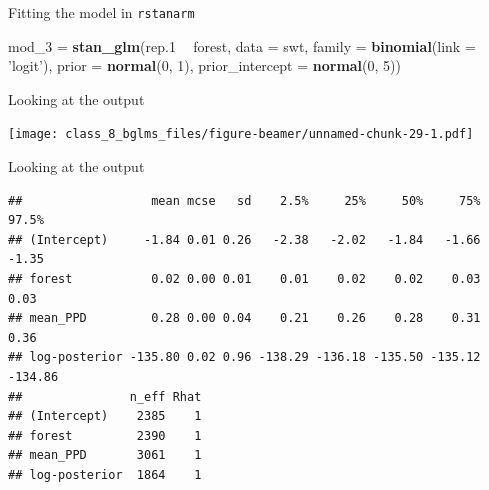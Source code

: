 \documentclass[ignorenonframetext,]{beamer}
\newenvironment{Shaded}{\begin{snugshade}}{\end{snugshade}}
\newcommand{\KeywordTok}[1]{\textcolor[rgb]{0.13,0.29,0.53}{\textbf{#1}}}
\newcommand{\DataTypeTok}[1]{\textcolor[rgb]{0.13,0.29,0.53}{#1}}
\newcommand{\DecValTok}[1]{\textcolor[rgb]{0.00,0.00,0.81}{#1}}
\newcommand{\StringTok}[1]{\textcolor[rgb]{0.31,0.60,0.02}{#1}}
\newcommand{\OperatorTok}[1]{\textcolor[rgb]{0.81,0.36,0.00}{\textbf{#1}}}
\newcommand{\NormalTok}[1]{#1}
\begin{document}
\begin{frame}[fragile]{Fitting the model in \texttt{rstanarm}}

\begin{Shaded}
\begin{Highlighting}[]
\NormalTok{mod_}\DecValTok{3}\NormalTok{ =}\StringTok{ }\KeywordTok{stan_glm}\NormalTok{(rep.}\DecValTok{1} \OperatorTok{~}\StringTok{ }\NormalTok{forest, }
                 \DataTypeTok{data =}\NormalTok{ swt,}
                 \DataTypeTok{family =} \KeywordTok{binomial}\NormalTok{(}\DataTypeTok{link =} \StringTok{'logit'}\NormalTok{),}
                 \DataTypeTok{prior =} \KeywordTok{normal}\NormalTok{(}\DecValTok{0}\NormalTok{, }\DecValTok{1}\NormalTok{),}
                 \DataTypeTok{prior_intercept =} \KeywordTok{normal}\NormalTok{(}\DecValTok{0}\NormalTok{, }\DecValTok{5}\NormalTok{))}
\end{Highlighting}
\end{Shaded}

\end{frame}

\begin{frame}{Looking at the output}

\texttt{[image: class\_8\_bglms\_files/figure-beamer/unnamed-chunk-29-1.pdf]}

\end{frame}

\begin{frame}[fragile]{Looking at the output}

\tiny

\begin{verbatim}
##                  mean mcse   sd    2.5%     25%     50%     75%   97.5%
## (Intercept)     -1.84 0.01 0.26   -2.38   -2.02   -1.84   -1.66   -1.35
## forest           0.02 0.00 0.01    0.01    0.02    0.02    0.03    0.03
## mean_PPD         0.28 0.00 0.04    0.21    0.26    0.28    0.31    0.36
## log-posterior -135.80 0.02 0.96 -138.29 -136.18 -135.50 -135.12 -134.86
##               n_eff Rhat
## (Intercept)    2385    1
## forest         2390    1
## mean_PPD       3061    1
## log-posterior  1864    1
\end{verbatim}

\end{frame}
\end{document}
